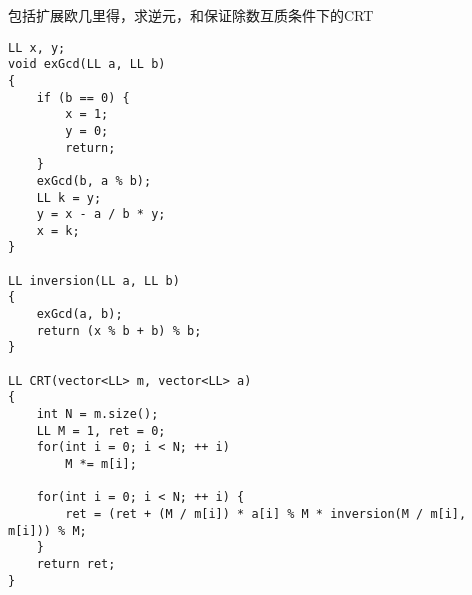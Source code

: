 包括扩展欧几里得，求逆元，和保证除数互质条件下的CRT
\begin{lstlisting}
LL x, y;
void exGcd(LL a, LL b)
{
	if (b == 0) {
		x = 1;
		y = 0;
		return;
	}
	exGcd(b, a % b);
	LL k = y;
	y = x - a / b * y;
	x = k;
}

LL inversion(LL a, LL b)
{
	exGcd(a, b);
	return (x % b + b) % b;
}

LL CRT(vector<LL> m, vector<LL> a)
{
	int N = m.size();
	LL M = 1, ret = 0;
	for(int i = 0; i < N; ++ i)
		M *= m[i];
	
	for(int i = 0; i < N; ++ i) {
		ret = (ret + (M / m[i]) * a[i] % M * inversion(M / m[i], m[i])) % M;
	}
	return ret;
}
\end{lstlisting}

